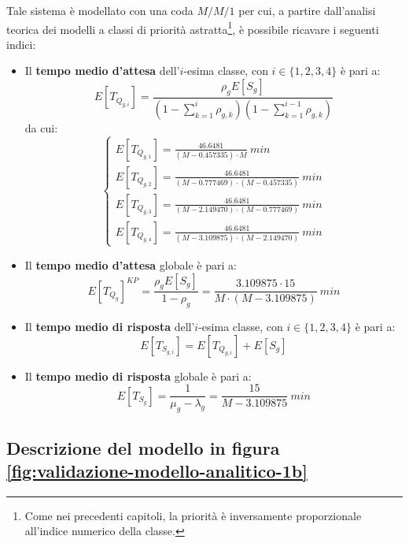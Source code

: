 Tale sistema è modellato con una coda $M/M/1$ per cui, a partire dall'analisi teorica dei modelli a classi di priorità astratta\footnote{\label{note:validazione-1}Come nei precedenti capitoli, la priorità è inversamente proporzionale all'indice numerico della classe.}, è possibile ricavare i seguenti indici:
\begin{itemize}
\item Il \textbf{tempo medio d'attesa} dell'$i$-esima classe, con $i\in\lbrace 1, 2, 3, 4\rbrace$ è pari a:
\begin{equation}
E[T_{Q_{g,i}}] = \frac{\rho_g E[S_g]}{\left(1- \sum_{k=1}^{i} \rho_{g,k}\right)\left(1- \sum_{k=1}^{i-1} \rho_{g,k}\right)}
\end{equation}
da cui:
\begin{equation}
\begin{cases}
E[T_{Q_{g,1}}] = \frac{46.6481}{(M-0.457335)\cdot M}\ min \\[1.5em]
E[T_{Q_{g,2}}] = \frac{46.6481}{(M-0.777469)\cdot(M-0.457335)}\ min \\[1em]
E[T_{Q_{g,3}}] = \frac{46.6481}{(M-2.149470)\cdot(M-0.777469)}\ min \\[1em]
E[T_{Q_{g,4}}] = \frac{46.6481}{(M-3.109875)\cdot(M-2.149470)}\ min
\end{cases}
\end{equation}
\item Il \textbf{tempo medio d'attesa} globale è pari a:
\begin{equation}
\label{eqn:validazione-modello-analitico-11}
E[T_{Q_g}]^{KP} = \frac{\rho_g E[S_g]}{1-\rho_g} = \frac{3.109875\cdot 15}{M\cdot (M-3.109875)}\ min
\end{equation}
\item Il \textbf{tempo medio di risposta} dell'$i$-esima classe, con $i\in\lbrace 1, 2, 3, 4\rbrace$ è pari a:
\begin{equation}
E[T_{S_{g,i}}] = E[T_{Q_{g,i}}] + E[S_g]
\end{equation}
\item Il \textbf{tempo medio di risposta} globale è pari a:
\begin{equation}
\label{eqn:validazione-modello-analitico-13}
E[T_{S_g}] = \frac{1}{\mu_g - \lambda_g} = \frac{15}{M-3.109875}\ min
\end{equation}
\end{itemize}

\subsection{Descrizione del modello in figura \ref{fig:validazione-modello-analitico-1b}}

